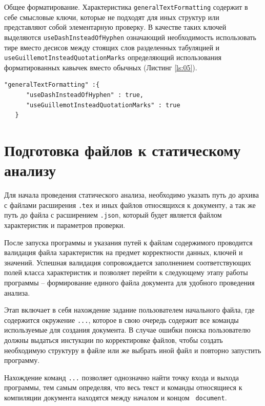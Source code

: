      Общее форматирование. Характеристика \verb|generalTextFormatting| содержит в себе смысловые ключи, которые не подходят для иных структур или представляют собой элементарную проверку. В качестве таких ключей выделяются \verb|useDashInsteadOfHyphen| означающий необходимость использовать тире вместо десисов между стоящих слов разделенных табуляцией и \verb|useGuillemotInsteadQuotationMarks| определяющий использования форматированных кавычек вместо обычных (Листинг \ref{ls:05}).

        \begin{lstlisting}[caption = {Пример общей конфигурации форматирования документа}, label={ls:05}]
     "generalTextFormatting" :{
      "useDashInsteadOfHyphen" : true,
      "useGuillemotInsteadQuotationMarks" : true
   }
     \end{lstlisting}   

\section{Подготовка файлов к статическому анализу}

Для начала проведения статического анализа, необходимо указать путь до архива с файлами расширения \verb|.tex| и иных файлов относящихся к документу, а так же путь до файла с расширением \verb|.json|, который будет является файлом характеристик и параметров проверки. 

После запуска программы и указания путей к файлам содержимого проводится валидация файла характеристик на предмет корректности данных, ключей и значений. Успешная валидация сопровождается заполнением соответствующих полей класса характеристик и позволяет перейти к следующему этапу работы программы -- формирование единого файла документа для удобного проведения анализа. 

Этап включает в себя нахождение задание пользователем начального файла, где содержится окружение  \verb|...|, которое в свою очередь содержит все команды используемые для создания документа. В случае ошибки поиска пользователю должны выдаться инстукции по корректировке файлов, чтобы создать необходимую структуру в файле или же выбрать иной файл и повторно запустить программу. 

Нахождение команд  \verb|...| позволяет однозначно найти точку входа и выхода программы, тем самым определяя, что весь текст и команды относящиеся к компиляции документа находятся между началом и концом \guillemotright  \verb| document|.

